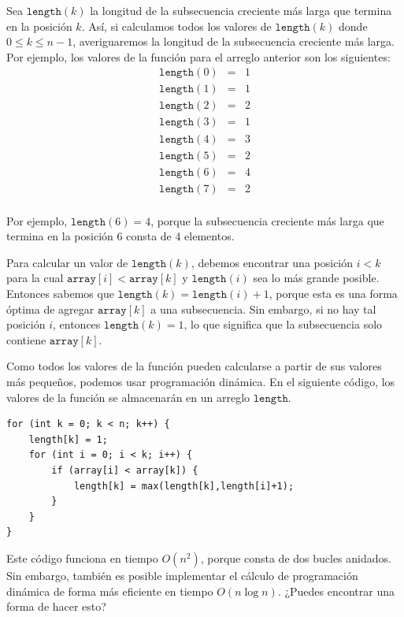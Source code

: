 Sea $\texttt{length}(k)$
la longitud de la
subsecuencia creciente más larga
que termina en la posición $k$.
Así, si calculamos todos los valores de
$\texttt{length}(k)$ donde $0 \le k \le n-1$,
averiguaremos la longitud de la
subsecuencia creciente más larga.
Por ejemplo, los valores de la función
para el arreglo anterior son los siguientes:
\[
\begin{array}{lcl}
\texttt{length}(0) & = & 1 \\
\texttt{length}(1) & = & 1 \\
\texttt{length}(2) & = & 2 \\
\texttt{length}(3) & = & 1 \\
\texttt{length}(4) & = & 3 \\
\texttt{length}(5) & = & 2 \\
\texttt{length}(6) & = & 4 \\
\texttt{length}(7) & = & 2 \\
\end{array}
\]

Por ejemplo, $\texttt{length}(6)=4$,
porque la subsecuencia creciente más larga
que termina en la posición 6 consta de 4 elementos.

Para calcular un valor de $\texttt{length}(k)$,
debemos encontrar una posición $i<k$
para la cual $\texttt{array}[i]<\texttt{array}[k]$
y $\texttt{length}(i)$ sea lo más grande posible.
Entonces sabemos que
$\texttt{length}(k)=\texttt{length}(i)+1$,
porque esta es una forma óptima de agregar
$\texttt{array}[k]$ a una subsecuencia.
Sin embargo, si no hay tal posición $i$,
entonces $\texttt{length}(k)=1$,
lo que significa que la subsecuencia solo contiene
$\texttt{array}[k]$.

Como todos los valores de la función pueden calcularse
a partir de sus valores más pequeños,
podemos usar programación dinámica.
En el siguiente código, los valores
de la función se almacenarán en un arreglo
$\texttt{length}$.

\begin{lstlisting}
for (int k = 0; k < n; k++) {
    length[k] = 1;
    for (int i = 0; i < k; i++) {
        if (array[i] < array[k]) {
            length[k] = max(length[k],length[i]+1);
        }
    }
}
\end{lstlisting}

Este código funciona en tiempo $O(n^2)$,
porque consta de dos bucles anidados.
Sin embargo, también es posible implementar
el cálculo de programación dinámica
de forma más eficiente en tiempo $O(n \log n)$.
¿Puedes encontrar una forma de hacer esto?

